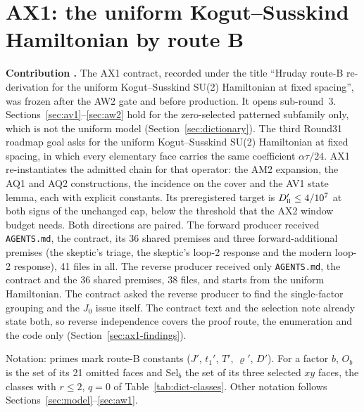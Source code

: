 \section{AX1: the uniform Kogut--Susskind Hamiltonian by route B}
\label{sec:ax1}

\textbf{Contribution .} The AX1 contract, recorded under
the title ``Hruday route-B re-derivation for the uniform Kogut--Susskind SU(2)
Hamiltonian at fixed spacing'', was frozen after the AW2 gate and before
production. It opens sub-round~3. Sections~\ref{sec:av1}--\ref{sec:aw2} hold
for the zero-selected patterned subfamily only, which is not the uniform model
(Section~\ref{sec:dictionary}). The third Round31 roadmap goal asks for the
uniform Kogut--Susskind SU(2) Hamiltonian at fixed spacing, in which every
elementary face carries the same coefficient $\alpha\tau/24$. AX1
re-instantiates the admitted chain for that operator: the AM2 expansion, the
AQ1 and AQ2 constructions, the incidence on the cover and the AV1 state lemma,
each with explicit constants. Its preregistered target is
$D'_{\rm ii}\le4/10^7$ at both signs of the unchanged cap, below the
threshold that the AX2 window budget needs. Both directions are paired. The forward producer
received \texttt{AGENTS.md}, the contract, its 36 shared premises and three
forward-additional premises (the skeptic's triage, the skeptic's loop-2
response and the modern loop-2 response), 41 files in all. The reverse
producer received only \texttt{AGENTS.md}, the contract and the 36 shared
premises, 38 files, and starts from the uniform Hamiltonian. The contract asked
the reverse producer to find the single-factor grouping and the $J_0$ issue
itself. The contract text and the selection note already state both, so
reverse independence covers the proof route, the enumeration and the code only
(Section~\ref{sec:ax1-findings}).

Notation: primes mark route-B constants ($J'$, $t_1'$, $T'$, $\varrho'$,
$D'$). For a factor $b$, $O_b$ is the set of its 21 omitted faces and
$\mathrm{Sel}_b$ the set of its three selected $xy$ faces, the classes with
$r\le2$, $q=0$ of Table~\ref{tab:dict-classes}. Other notation follows
Sections~\ref{sec:model}--\ref{sec:aw1}.

